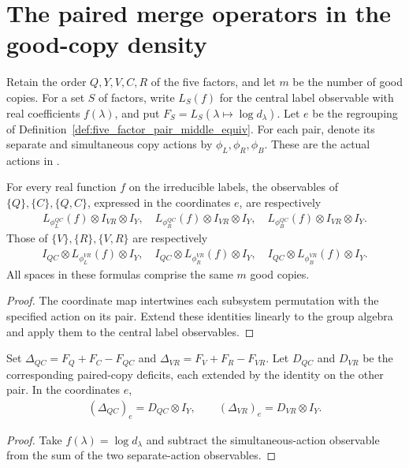 \section{The paired merge operators in the good-copy density}
\label{sec:replica_good_configuration_merge_transport}

Retain the order $Q,Y,V,C,R$ of the five factors, and let $m$ be the
number of good copies. For a set $S$ of factors, write $L_S(f)$ for
the central label observable with real coefficients $f(\lambda)$,
and put $F_S=L_S(\lambda\mapsto\log d_\lambda)$. Let $e$ be the
regrouping of Definition~\ref{def:five_factor_pair_middle_equiv}.
For each pair, denote its separate and simultaneous copy actions by
$\phi_L,\phi_R,\phi_B$. These are the actual actions in
\cite[Section~8, lines~501--549]{OpenAI2026AreaLaw}.

\begin{theorem}
\label{thm:five_factor_pair_middle_label_observable}
\leanok
For every real function $f$ on the irreducible labels, the observables
of $\{Q\},\{C\},\{Q,C\}$, expressed in the coordinates $e$, are
respectively
\begin{align*}
 L_{\phi_L^{QC}}(f)\otimes I_{VR}\otimes I_Y,\quad
 L_{\phi_R^{QC}}(f)\otimes I_{VR}\otimes I_Y,\quad
 L_{\phi_B^{QC}}(f)\otimes I_{VR}\otimes I_Y.
\end{align*}
Those of $\{V\},\{R\},\{V,R\}$ are respectively
\begin{align*}
 I_{QC}\otimes L_{\phi_L^{VR}}(f)\otimes I_Y,\quad
 I_{QC}\otimes L_{\phi_R^{VR}}(f)\otimes I_Y,\quad
 I_{QC}\otimes L_{\phi_B^{VR}}(f)\otimes I_Y.
\end{align*}
All spaces in these formulas comprise the same $m$ good copies.
\end{theorem}
\begin{proof}\leanok
{}
The coordinate map intertwines each subsystem permutation with the
specified action on its pair. Extend these identities linearly to the
group algebra and apply them to the central label observables.
\end{proof}

\begin{theorem}
\label{thm:five_factor_pair_middle_merge_deficits}
\leanok
Set $\Delta_{QC}=F_Q+F_C-F_{QC}$ and
$\Delta_{VR}=F_V+F_R-F_{VR}$. Let $D_{QC}$ and $D_{VR}$ be the
corresponding paired-copy deficits, each extended by the identity on
the other pair. In the coordinates $e$,
\begin{align*}
 (\Delta_{QC})_e=D_{QC}\otimes I_Y,
 \qquad (\Delta_{VR})_e=D_{VR}\otimes I_Y.
\end{align*}
\end{theorem}
\begin{proof}\leanok
{}
Take $f(\lambda)=\log d_\lambda$ and subtract the simultaneous-action
observable from the sum of the two separate-action observables.
\end{proof}

